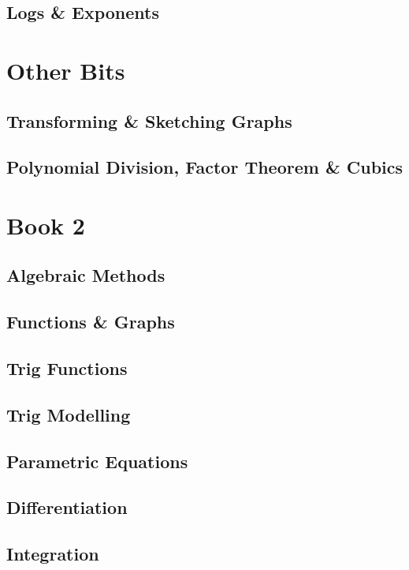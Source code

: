 \documentclass{report}
\begin{document}
\chapter{Logs \& Exponents}



\part{Other Bits}
\setcounter{chapter}{0}
\chapter{Transforming \& Sketching Graphs}

\chapter{Polynomial Division, Factor Theorem \& Cubics}



\part{Book 2}

\setcounter{chapter}{0}
\chapter{Algebraic Methods}


\chapter{Functions \& Graphs}


\setcounter{chapter}{5}
\chapter{Trig Functions}


\chapter{Trig Modelling}


\chapter{Parametric Equations}


\chapter{Differentiation}


\setcounter{chapter}{10}
\chapter{Integration}

\end{document}
